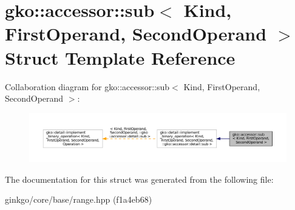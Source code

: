 \hypertarget{structgko_1_1accessor_1_1sub}{}\section{gko\+:\+:accessor\+:\+:sub$<$ Kind, First\+Operand, Second\+Operand $>$ Struct Template Reference}
\label{structgko_1_1accessor_1_1sub}


Collaboration diagram for gko\+:\+:accessor\+:\+:sub$<$ Kind, First\+Operand, Second\+Operand $>$\+:
\nopagebreak
\begin{figure}[H]
\begin{center}
\leavevmode
\includegraphics[width=350pt]{structgko_1_1accessor_1_1sub__coll__graph}
\end{center}
\end{figure}


The documentation for this struct was generated from the following file\+:\begin{DoxyCompactItemize}
\item 
ginkgo/core/base/range.\+hpp (f1a4eb68)\end{DoxyCompactItemize}
